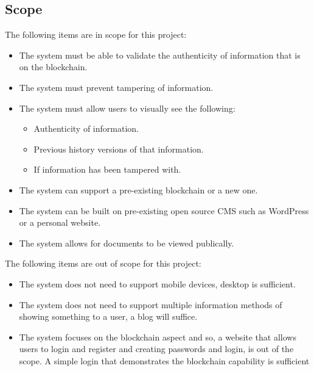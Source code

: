 \subsection{Scope}

The following items are in scope for this project:
\begin{itemize}
	\item The system must be able to validate the authenticity of information that is on the blockchain.
	\item The system must prevent tampering of information.
	\item The system must allow users to visually see the following:
	\begin{itemize}
		\item Authenticity of information.
		\item Previous history versions of that information.
		\item If information has been tampered with.
	\end{itemize}
	\item The system can support a pre-existing blockchain or a new one.
	\item The system can be built on pre-existing open source CMS such as WordPress or a personal website. 
	\item The system allows for documents to be viewed publically.
\end{itemize}
The following items are out of scope for this project:
\begin{itemize}
	\item The system does not need to support mobile devices, desktop is sufficient.
	\item The system does not need to support multiple information methods of showing something to a user,
		  a blog will suffice.
	\item The system focuses on the blockchain aspect and so, a website that allows users to login and register
		  and creating passwords and login, is out of the scope. A simple login that demonstrates the blockchain 
		  capability is sufficient
\end{itemize}
